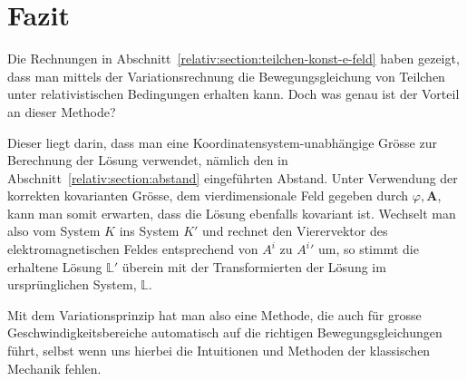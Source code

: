 
\section{Fazit 
\label{relativ:section:fazit}}

Die Rechnungen in Abschnitt~\ref{relativ:section:teilchen-konst-e-feld}
haben gezeigt, dass man mittels der Variationsrechnung
die Bewegungsgleichung von Teilchen unter relativistischen
Bedingungen erhalten kann.
Doch was genau ist der Vorteil an dieser Methode?

Dieser liegt darin, dass man eine
Koordinatensystem-unabhängige Grösse zur Berechnung
der Lösung verwendet, nämlich den in Abschnitt~\ref{relativ:section:abstand}
eingeführten Abstand.
Unter Verwendung der korrekten kovarianten Grösse,
dem vierdimensionale Feld gegeben durch \(\varphi, \bm{A}\),
kann man somit erwarten, dass die Lösung ebenfalls kovariant ist.
Wechselt man also vom System \(K\) ins System \(K'\) und
rechnet den Vierervektor des elektromagnetischen Feldes entsprechend
von \(A^i\) zu \({A^i}'\) um, so stimmt die erhaltene Lösung \(\mathbb{L}'\)
überein mit der Transformierten der Lösung im ursprünglichen System, \(\mathbb{L}\).

Mit dem Variationsprinzip hat man also eine Methode,
die auch für grosse Geschwindigkeitsbereiche automatisch
auf die richtigen Bewegungsgleichungen führt, selbst wenn uns
hierbei die Intuitionen und Methoden der klassischen Mechanik fehlen.
